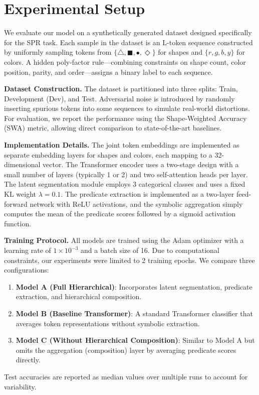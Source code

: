 \documentclass{article}
\begin{document}
\section{Experimental Setup}
We evaluate our model on a synthetically generated dataset designed specifically for the SPR task. Each sample in the dataset is an L-token sequence constructed by uniformly sampling tokens from $\{\triangle, \blacksquare, \bullet, \Diamond\}$ for shapes and $\{r, g, b, y\}$ for colors. A hidden poly-factor rule—combining constraints on shape count, color position, parity, and order—assigns a binary label to each sequence.

\textbf{Dataset Construction.} The dataset is partitioned into three splits: Train, Development (Dev), and Test. Adversarial noise is introduced by randomly inserting spurious tokens into some sequences to simulate real-world distortions. For evaluation, we report the performance using the Shape-Weighted Accuracy (SWA) metric, allowing direct comparison to state-of-the-art baselines.

\textbf{Implementation Details.} The joint token embeddings are implemented as separate embedding layers for shapes and colors, each mapping to a 32-dimensional vector. The Transformer encoder uses a two-stage design with a small number of layers (typically 1 or 2) and two self-attention heads per layer. The latent segmentation module employs 3 categorical classes and uses a fixed KL weight $\lambda=0.1$. The predicate extraction is implemented as a two-layer feed-forward network with ReLU activations, and the symbolic aggregation simply computes the mean of the predicate scores followed by a sigmoid activation function.

\textbf{Training Protocol.} All models are trained using the Adam optimizer with a learning rate of $1\times10^{-3}$ and a batch size of 16. Due to computational constraints, our experiments were limited to 2 training epochs. We compare three configurations:
\begin{enumerate}
    \item \textbf{Model A (Full Hierarchical)}: Incorporates latent segmentation, predicate extraction, and hierarchical composition.
    \item \textbf{Model B (Baseline Transformer)}: A standard Transformer classifier that averages token representations without symbolic extraction.
    \item \textbf{Model C (Without Hierarchical Composition)}: Similar to Model A but omits the aggregation (composition) layer by averaging predicate scores directly.
\end{enumerate}
Test accuracies are reported as median values over multiple runs to account for variability.
\end{document}
